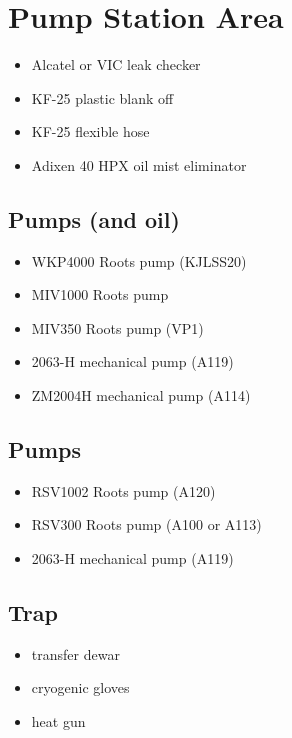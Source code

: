 \section{Pump Station Area}
  \begin{itemize}
   \item Alcatel or VIC leak checker
   \item KF-25 plastic blank off
   \item KF-25 flexible hose
   \item Adixen 40 HPX oil mist eliminator 
  \end{itemize}

  \subsection{\het{} Pumps (and oil)} %
\begin{itemize}
 \item {} WKP4000 Roots pump (KJLSS20)
 \item {} MIV1000 Roots pump
 \item {} MIV350 Roots pump (VP1)
 \item {} 2063-H mechanical pump (A119)
 \item {} ZM2004H mechanical pump (A114)
\end{itemize}

  \subsection{\hef{} Pumps}
\begin{itemize}
 \item {} RSV1002 Roots pump (A120)
 \item {} RSV300 Roots pump (A100 or A113)
 \item {} 2063-H mechanical pump (A119)
\end{itemize}

  \subsection{\lnn{} Trap}
\begin{itemize}
 \item \lnn{} transfer dewar
\item cryogenic gloves
\item heat gun
\end{itemize}

